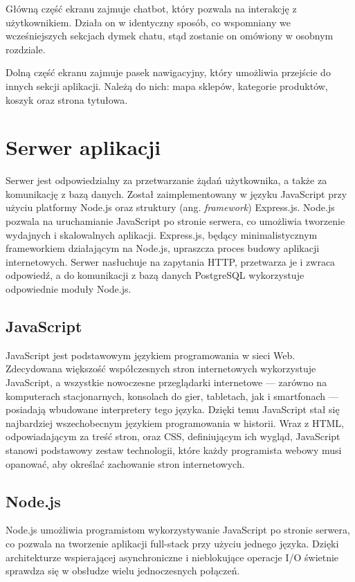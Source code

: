 Główną część ekranu zajmuje chatbot, który pozwala na interakcję z użytkownikiem. Działa on w identyczny sposób, co wspomniany we wcześniejszych sekcjach dymek chatu, stąd zostanie on omówiony w osobnym rozdziale.

Dolną część ekranu zajmuje pasek nawigacyjny, który umożliwia przejście do innych sekcji aplikacji. Należą do nich: mapa sklepów, kategorie produktów, koszyk oraz strona tytułowa.

\section{Serwer aplikacji}
Serwer jest odpowiedzialny za przetwarzanie żądań użytkownika, a także za komunikację z bazą danych. Został zaimplementowany w języku JavaScript przy użyciu platformy Node.js oraz struktury (ang. \textit{framework}) Express.js. Node.js pozwala na uruchamianie JavaScript po stronie serwera, co umożliwia tworzenie wydajnych i skalowalnych aplikacji. Express.js, będący minimalistycznym frameworkiem działającym na Node.js, upraszcza proces budowy aplikacji internetowych. Serwer nasłuchuje na zapytania HTTP, przetwarza je i zwraca odpowiedź, a do komunikacji z bazą danych PostgreSQL wykorzystuje odpowiednie moduły Node.js.


\subsection{JavaScript}
JavaScript jest podstawowym językiem programowania w sieci Web. Zdecydowana większość współczesnych stron internetowych wykorzystuje JavaScript, a wszystkie nowoczesne przeglądarki internetowe — zarówno na komputerach stacjonarnych, konsolach do gier, tabletach, jak i smartfonach — posiadają wbudowane interpretery tego języka. Dzięki temu JavaScript stał się najbardziej wszechobecnym językiem programowania w historii. Wraz z HTML, odpowiadającym za treść stron, oraz CSS, definiującym ich wygląd, JavaScript stanowi podstawowy zestaw technologii, które każdy programista webowy musi opanować, aby określać zachowanie stron internetowych. \cite{flanagan2011javascript}


\subsection{Node.js}
Node.js umożliwia programistom wykorzystywanie JavaScript po stronie serwera, co pozwala na tworzenie aplikacji full-stack przy użyciu jednego języka. Dzięki architekturze wspierającej asynchroniczne i nieblokujące operacje I/O świetnie sprawdza się w obsłudze wielu jednoczesnych połączeń. \cite{peters2017building}

